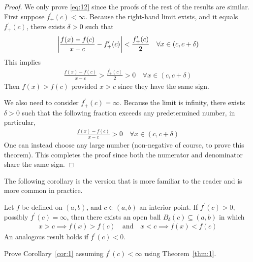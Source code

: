\documentclass[thmcnt=section, 12pt]{my-elegantbook}
\begin{document}
\begin{proof}
    We only prove \eqref{eq:12} since the proofs of the rest of the results are similar. First suppose $f^\prime_{+}(c) < \infty$. Because the right-hand limit exists, and it equals $f^\prime_{+}(c)$, there exists $\delta > 0$ such that
    \begin{align*}
        \left\lvert 
            \frac{f(x) - f(c)}{x - c}
            - f^\prime_{+}(c)
         \right\rvert < \frac{f^\prime_{+}(c)}{2}
        \quad \forall x \in (c, c+\delta)
    \end{align*}
    This implies
    \begin{align*}
        \frac{f(x) - f(c)}{x - c} > \frac{f^\prime_{+}(c)}{2} > 0
        \quad \forall x \in (c, c+\delta)
    \end{align*}
    Then $f(x) > f(c)$ provided $x > c$ since they have the same sign.
    
    We also need to consider $f^\prime_{+}(c) = \infty$. Because the limit is infinity, there exists $\delta > 0$ such that the following fraction exceeds any predetermined number, in particular,
    \begin{align*}
        \frac{f(x) - f(c)}{x - c} > 0
        \quad \forall x \in (c, c+\delta)
    \end{align*}
    One can instead choose any large number (non-negative of course, to prove this theorem). This completes the proof since both the numerator and denominator share the same sign.
\end{proof}

\par The following corollary is the version that is more familiar to the reader and is more common in practice.

\begin{corollary} \label{cor:1}
    Let $f$ be defined on $(a, b)$, and $c \in (a, b)$ an interior point. If $f^\prime(c) > 0$, possibly $f^\prime(c) = \infty$, then there exists an open ball $B_\delta(c) \subseteq (a, b)$ in which
    \begin{align}
        x > c \implies f(x) > f(c)
        \quad \text{and} \quad 
        x < c \implies f(x) < f(c)
        \label{eq:14}
    \end{align}
    An analogous result holds if $f^\prime(c) < 0$.
\end{corollary}

\begin{exercise}
    Prove Corollary~\ref{cor:1} assuming $f^\prime(c) < \infty$ using Theorem~\ref{thm:1}.
\end{exercise}
\end{document}
